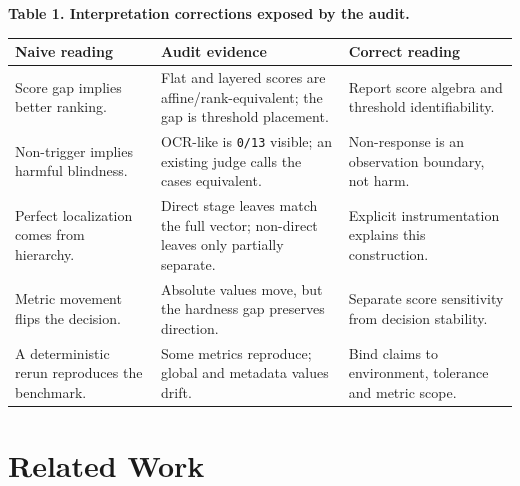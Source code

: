 \documentclass[10pt,conference]{IEEEtran}
\begin{document}
\textbf{Table 1. Interpretation corrections exposed by the audit.}
\begin{table}[t]
\centering
\small
\setlength{\tabcolsep}{3pt}
\begin{tabular}{>{\raggedright\arraybackslash}p{}>{\raggedright\arraybackslash}p{}>{\raggedright\arraybackslash}p{}}
\hline
Naive reading & Audit evidence & Correct reading \\
\hline
Score gap implies better ranking. & Flat and layered scores are affine/rank-equivalent; the gap is threshold placement. & Report score algebra and threshold identifiability. \\
Non-trigger implies harmful blindness. & OCR-like is \texttt{0/13} visible; an existing judge calls the cases equivalent. & Non-response is an observation boundary, not harm. \\
Perfect localization comes from hierarchy. & Direct stage leaves match the full vector; non-direct leaves only partially separate. & Explicit instrumentation explains this construction. \\
Metric movement flips the decision. & Absolute values move, but the hardness gap preserves direction. & Separate score sensitivity from decision stability. \\
A deterministic rerun reproduces the benchmark. & Some metrics reproduce; global and metadata values drift. & Bind claims to environment, tolerance and metric scope. \\
\hline
\end{tabular}
\end{table}
\section{Related Work}
\end{document}
